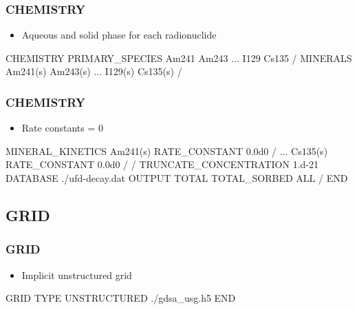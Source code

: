 \documentclass{beamer}
\newcommand\bluecomment[1]{{{\color{blue} #1}}}
\begin{document}
\begin{frame}[fragile]\frametitle{CHEMISTRY}

\begin{itemize}
  \item Aqueous and solid phase for each radionuclide
\end{itemize}

\begin{semiverbatim}
CHEMISTRY
  PRIMARY_SPECIES
    Am241
    Am243
    \bluecomment{...}
    I129
    Cs135
  /
  MINERALS
    Am241(s)
    Am243(s)
    \bluecomment{...}
    I129(s)
    Cs135(s)
  /
\end{semiverbatim}

\end{frame}

\begin{frame}[fragile]\frametitle{CHEMISTRY}

\begin{itemize}
  \item Rate constants = 0
\end{itemize}

\begin{semiverbatim}\small
  MINERAL_KINETICS
    Am241(s)
      RATE_CONSTANT 0.0d0
    /
    \bluecomment{...}
    Cs135(s)
      RATE_CONSTANT 0.0d0
    /
  /
  TRUNCATE_CONCENTRATION 1.d-21
  DATABASE ./ufd-decay.dat
  OUTPUT
    TOTAL
    TOTAL_SORBED
    ALL
  /
END
\end{semiverbatim}

\end{frame}

\subsection{GRID}

\begin{frame}[fragile]\frametitle{GRID}

\begin{itemize}
  \item Implicit unstructured grid 
\end{itemize}

\begin{semiverbatim}
GRID
  TYPE UNSTRUCTURED ./gdsa_usg.h5
END
\end{semiverbatim}

\end{frame}
\end{document}
